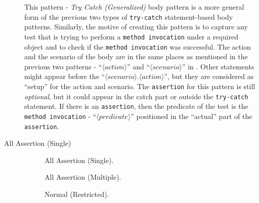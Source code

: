 \documentclass[proposal.tex]{subfiles}
\begin{document}
\begin{description}
This pattern - \textit{Try Catch (Generalized)} body pattern is a more general form of the previous two types of \texttt{try-catch} statement-based body patterns.
%
Similarly, the motive of creating this pattern is to capture any test that is trying to perform a \texttt{method invocation} under a required object and to check if the \texttt{method invocation} was successful.
%
The action and the scenario of the body are in the same places as mentioned in the previous two patterns - \enquote{$\langle action \rangle$} and \enquote{$\langle scenario \rangle$} in .
%
Other statements might appear before the \enquote{$\langle scenario \rangle.\langle action \rangle$}, but they are considered as \enquote{setup} for the action and scenario.
%
The \texttt{assertion} for this pattern is still \emph{optional}, but it could appear in the catch part or outside the \texttt{try-catch} statement.
%
If there is an \texttt{assertion}, then the predicate of the test is the \texttt{method invocation} - \enquote{$\langle predicate \rangle$} positioned in the \enquote{actual} part of the \texttt{assertion}.


\item[All Assertion (Single)] 

\begin{figure}[t]
\centering
    \begin{subfigure}{0.7\textwidth}
    \end{subfigure}
\caption{All Assertion (Single).}
\label{AllA_single}
\end{figure}

\begin{figure}[t]
\centering
    \begin{subfigure}{0.8\textwidth}
    \end{subfigure}
\caption{All Assertion (Multiple).}
\label{AllA_mutiple}
\end{figure}

\begin{figure}[!htb]
\centering
    \begin{subfigure}{0.675\textwidth}
    \end{subfigure}
\caption{Normal (Restricted).}
\label{NP_2/3}
\end{figure}


\end{description}
\end{document}
